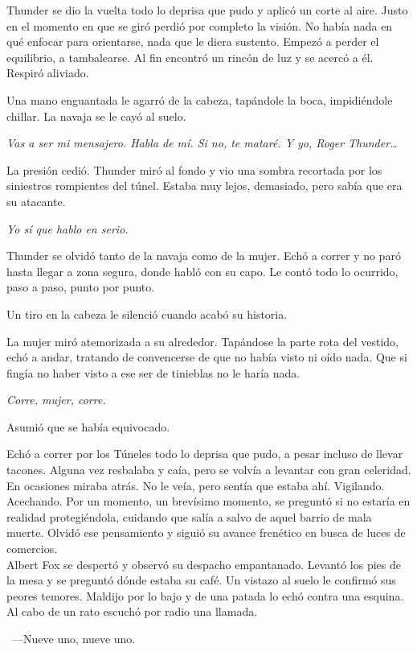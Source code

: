 Thunder se dio la vuelta todo lo deprisa que pudo y aplicó un corte al aire. Justo en el momento en que se giró perdió por completo la visión. No había nada en qué enfocar para orientarse, nada que le diera sustento. Empezó a perder el equilibrio, a tambalearse. Al fin encontró un rincón de luz y se acercó a él. Respiró aliviado.

Una mano enguantada le agarró de la cabeza, tapándole la boca, impidiéndole chillar. La navaja se le cayó al suelo.

\emph{Vas a ser mi mensajero. Habla de mí. Si no, te mataré. Y yo, Roger Thunder\dots}

La presión cedió. Thunder miró al fondo y vio una sombra recortada por los siniestros rompientes del túnel. Estaba muy lejos, demasiado, pero sabía que era su atacante.

\emph{Yo sí que hablo en serio.}

Thunder se olvidó tanto de la navaja como de la mujer. Echó a correr y no paró hasta llegar a zona segura, donde habló con su capo. Le contó todo lo ocurrido, paso a paso, punto por punto.

Un tiro en la cabeza le silenció cuando acabó su historia.

La mujer miró atemorizada a su alrededor. Tapándose la parte rota del vestido, echó a andar, tratando de convencerse de que no había visto ni oído nada. Que si fingía no haber visto a ese ser de tinieblas no le haría nada.

\emph{Corre, mujer, corre.}

Asumió que se había equivocado.

Echó a correr por los Túneles todo lo deprisa que pudo, a pesar incluso de llevar tacones. Alguna vez resbalaba y caía, pero se volvía a levantar con gran celeridad. En ocasiones miraba atrás. No le veía, pero sentía que estaba ahí. Vigilando. Acechando. Por un momento, un brevísimo momento, se preguntó si no estaría en realidad protegiéndola, cuidando que salía a salvo de aquel barrio de mala muerte. Olvidó ese pensamiento y siguió su avance frenético en busca de luces de comercios.\\

\noindent{}Albert Fox se despertó y observó su despacho empantanado. Levantó los pies de la mesa y se preguntó dónde estaba su café. Un vistazo al suelo le confirmó sus peores temores. Maldijo por lo bajo y de una patada lo echó contra una esquina. Al cabo de un rato escuchó por radio una llamada.

~---Nueve uno, nueve uno.

